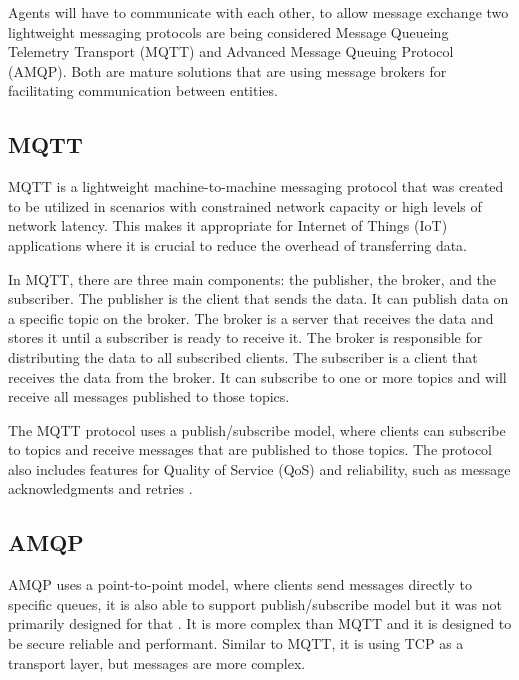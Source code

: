 Agents will have to communicate with each other, to allow message exchange two lightweight messaging protocols are being considered Message Queueing Telemetry Transport (MQTT) and Advanced Message Queuing Protocol (AMQP). Both are mature solutions that are using message brokers for facilitating communication between entities.

\subsection{MQTT}
MQTT is a lightweight machine-to-machine messaging protocol that was created to be utilized in scenarios with constrained network capacity or high levels of network latency. This makes it appropriate for Internet of Things (IoT) applications where it is crucial to reduce the overhead of transferring data.

In MQTT, there are three main components: the publisher, the broker, and the subscriber. The publisher is the client that sends the data. It can publish data on a specific topic on the broker. The broker is a server that receives the data and stores it until a subscriber is ready to receive it. The broker is responsible for distributing the data to all subscribed clients. The subscriber is a client that receives the data from the broker. It can subscribe to one or more topics and will receive all messages published to those topics. 
 \cite{mqtt_specification}

The MQTT protocol uses a publish/subscribe model, where clients can subscribe to topics and receive messages that are published to those topics. The protocol also includes features for Quality of Service (QoS) and reliability, such as message acknowledgments and retries \cite{amqp_vs_mqtt}.

\subsection{AMQP}
AMQP uses a point-to-point model, where clients send messages directly to specific queues, it is also able to support publish/subscribe model but it was not primarily designed for that \cite{amqp_specification}. It is more complex than MQTT and it is designed to be secure reliable and performant. Similar to MQTT, it is using TCP as a transport layer, but messages are more complex.


